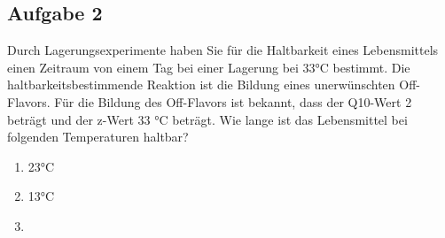 \documentclass[a4paper,11pt]{article}
\newif\ifshowme
\begin{document}
\ifshowme
\antwort{

Formel für die Aufgabe:

\begin{align}
D_1 = D_2 \cdot 10^{\frac{T_2 - T_1}{z}}
\end{align}


Reduktion der Keimzahl:
\begin{align*}
D_1 &= 5 ~\text{min} \cdot 10^{\frac{112 - 121}{10}} \\
 &= 0,629 ~\text{min}
\end{align*}

Enzyminaktivierung:
\begin{align*}
D_1 &= 15 ~\text{min} \cdot 10^{\frac{90 - 121}{25}} \\
 &= 0,86 ~\text{min}
\end{align*}

Kochgeschmack
\begin{align*}
D_1 &= 20 ~\text{min} \cdot 10^{\frac{100 - 121}{32}} \\
 &= 4,413 ~\text{min}
\end{align*}

 Da 0,629 min + 0,012 min kürzer ist als 4,413 min, kann der Erhitzungsprozess bei dieser Temperatur
durchgeführt werden, ohne dass ein Kochgeschmack auftritt.
}
\else
\fi




\subsection*{Aufgabe 2}
Durch Lagerungsexperimente haben Sie für die Haltbarkeit eines Lebensmittels einen
Zeitraum von einem Tag bei einer Lagerung bei 33°C bestimmt. Die
haltbarkeitsbestimmende Reaktion ist die Bildung eines unerwünschten Off-Flavors. Für
die Bildung des Off-Flavors ist bekannt, dass der Q10-Wert 2 beträgt und der z-Wert 33 °C
beträgt. Wie lange ist das Lebensmittel bei folgenden Temperaturen haltbar?

\begin{enumerate}[label=\alph*)]
\item 23°C
\item 13°C
\item 
\end{enumerate}
\ifshowme
\antwort{
Über Q$_{10}$-Wert:
\begin{align*}
D_1 &= 1 ~\text{Tag} \cdot 2^{\frac{33-23}{10}} \\
&= 2 ~\text{Tage}
\end{align*}
Über Z-Wert:
\begin{align*}
D_1 &= 1 ~\text{Tag} \cdot 10^{\frac{33-23}{33}} \\
 &= 2 ~\text{Tage}
\end{align*}

b) 4 Tage \pp
c) 8 Tage \pp
d) 10 Tage  
}
\else
\fi
\end{document}
